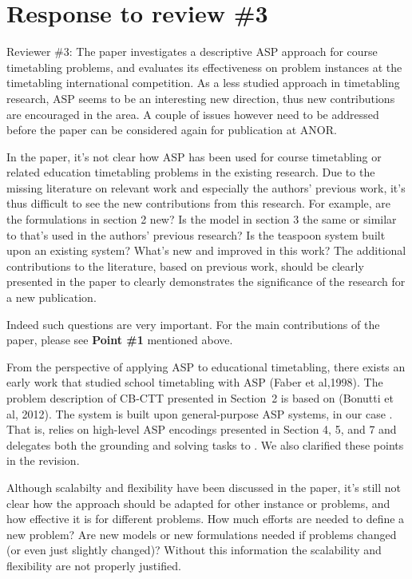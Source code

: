 \documentclass[a4j]{article}
\begin{document}
\section*{Response to review \#3}

\begin{it}\color{blue}
Reviewer \#3: The paper investigates a descriptive ASP approach for
course timetabling problems, and evaluates its effectiveness on
problem instances at the timetabling international competition. As a
less studied approach in timetabling research, ASP seems to be an
interesting new direction, thus new contributions are encouraged in
the area. A couple of issues however need to be addressed before the
paper can be considered again for publication at ANOR.

In the paper, it's not clear how ASP has been used for course
timetabling or related education timetabling problems in the existing
research. Due to the missing literature on relevant work and
especially the authors' previous work, it's thus difficult to see the
new contributions from this research. 
For example, are the
formulations in section 2 new? Is the model in section 3 the same or
similar to that's used in the authors' previous research? Is the
teaspoon system built upon an existing system? What's new and improved
in this work? The additional contributions to the literature, based on
previous work, should be clearly presented in the paper to clearly
demonstrates the significance of the research for a new publication.
\end{it}

Indeed such questions are very important.
For the main contributions of the paper, 
please see \textbf{Point \#1} mentioned above.

From the perspective of applying ASP to educational timetabling, 
there exists an early work that studied school timetabling with ASP
(Faber et al,1998). 
The problem description of CB-CTT presented in Section~2 is based on
(Bonutti et al, 2012).
The {\asap} system is built upon general-purpose ASP systems,
in our case {\clingo}. 
That is, {\asap} relies on high-level ASP encodings presented in
Section 4, 5, and 7 and delegates both the grounding and solving tasks
to {\clingo}.
We also clarified these points in the revision.

\begin{it}\color{blue}
Although scalabilty and flexibility have been discussed in the paper,
it's still not clear how the approach should be adapted for other
instance or problems, and how effective it is for different
problems. How much efforts are needed to define a new problem? Are new
models or new formulations needed if problems changed (or even just
slightly changed)? Without this information the scalability and
flexibility are not properly justified.
\end{it}
\end{document}
